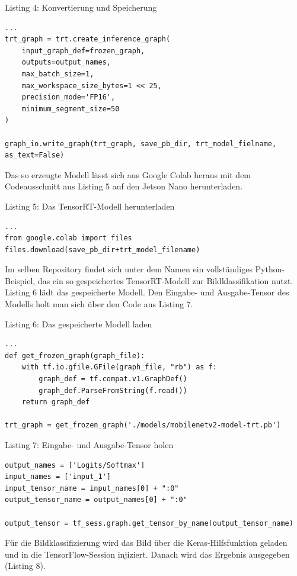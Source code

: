 Listing 4: Konvertierung und Speicherung 
\begin{lstlisting}
...
trt_graph = trt.create_inference_graph(
	input_graph_def=frozen_graph,
	outputs=output_names,
	max_batch_size=1,
	max_workspace_size_bytes=1 << 25,
    precision_mode='FP16',
    minimum_segment_size=50
)

graph_io.write_graph(trt_graph, save_pb_dir, trt_model_fielname, as_text=False)
\end{lstlisting}

Das so erzeugte Modell lässt sich aus Google Colab heraus mit dem Codeausschnitt aus Listing 5 auf den Jetson Nano herunterladen. 


Listing 5: Das TensorRT-Modell herunterladen 

\begin{lstlisting}
...
from google.colab import files
files.download(save_pb_dir+trt_model_filename)
\end{lstlisting}

Im selben Repository findet sich unter dem Namen  ein vollständiges Python-Beispiel, das ein so gespeichertes TensorRT-Modell zur Bildklassifikation nutzt. Listing 6 lädt das gespeicherte Modell. Den Eingabe- und Ausgabe-Tensor des Modells holt man sich über den Code aus Listing 7. 


Listing 6: Das gespeicherte Modell laden 
\begin{lstlisting}
...
def get_frozen_graph(graph_file):
    with tf.io.gfile.GFile(graph_file, "rb") as f:
        graph_def = tf.compat.v1.GraphDef()
        graph_def.ParseFromString(f.read())
    return graph_def

trt_graph = get_frozen_graph('./models/mobilenetv2-model-trt.pb')
\end{lstlisting}


Listing 7: Eingabe- und Ausgabe-Tensor holen 
\begin{lstlisting}
output_names = ['Logits/Softmax']
input_names = ['input_1']
input_tensor_name = input_names[0] + ":0"
output_tensor_name = output_names[0] + ":0"

output_tensor = tf_sess.graph.get_tensor_by_name(output_tensor_name)
\end{lstlisting}


Für die Bildklassifizierung wird das Bild über die Keras-Hilfsfunktion  geladen und in die TensorFlow-Session injiziert. Danach wird das Ergebnis ausgegeben (Listing 8). 


